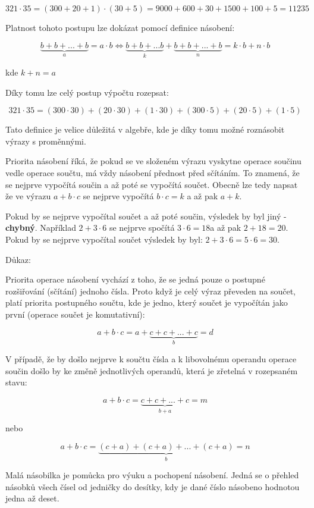 $$ 321 \cdot 35 = (300 + 20 + 1) \cdot (30 + 5) = 9000 + 600 + 30 + 1500 + 100 + 5 = 11235 $$

Platnost tohoto postupu lze dokázat pomocí definice násobení:

$$ \underbrace{b + b + ... + b}_a = a \cdot b \Leftrightarrow \underbrace{b+b+...b}_k + \underbrace{b+b+...+b}_n  = k\cdot b + n \cdot b  $$

kde $k+n = a$

Díky tomu lze celý postup výpočtu rozepsat:

$$ 321 \cdot 35 = (300\cdot 30) + (20 \cdot 30) + (1\cdot 30) + (300\cdot 5) + (20\cdot 5) + (1\cdot 5)$$

Tato definice je velice důležitá v algebře, kde je díky tomu možné roznásobit výrazy s proměnnými.


Priorita násobení říká, že pokud se ve složeném výrazu vyskytne operace součinu vedle operace součtu, má vždy násobení přednost před sčítáním. To znamená, že se nejprve vypočítá součin a až poté se vypočítá součet. Obecně lze tedy napsat že ve výrazu $a+b\cdot c$ se nejprve vypočítá $b \cdot c = k$ a až pak $a + k$.

Pokud by se nejprve vypočítal součet a až poté součin, výsledek by byl jiný - {\bf chybný}. Například $2+3 \cdot 6$ se nejprve spočítá $3\cdot 6 = 18$a až pak $2+18 = 20$. Pokud by se nejprve vypočítal součet výsledek by byl: $2+3 \cdot 6 = 5 \cdot 6 = 30$.

Důkaz:

Priorita operace násobení vychází z toho, že se jedná pouze o postupné rozšiřování (sčítání) jednoho čísla. Proto když je celý výraz převeden na součet, platí priorita postupného součtu, kde je jedno, který součet je vypočítán jako první (operace součet je komutativní):

$$ a + b \cdot c = a + \underbrace{c + c + ... + c}_b = d $$

V případě, že by došlo nejprve k součtu čísla a k libovolnému operandu operace součin došlo by ke změně jednotlivých operandů, která je zřetelná v rozepsaném stavu:


$$ a + b \cdot c = \underbrace{c + c + ... + c}_{b+a} = m $$

nebo

$$ a + b \cdot c = \underbrace{(c+a) + (c+a) + ... + (c+a)}_{b} = n $$


Malá násobilka je pomůcka pro výuku a pochopení násobení. Jedná se o přehled násobků všech čísel od jedničky do desítky, kdy je dané číslo násobeno hodnotou jedna až deset.

